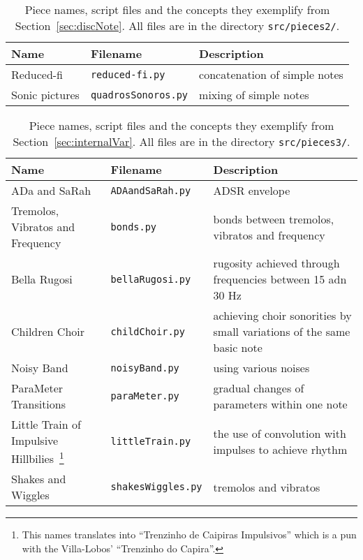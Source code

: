 \documentclass{scrreprt}
\begin{document}
\begin{table*}[htp!]
\centering
\caption{Piece names, script files and the concepts they exemplify from Section~\ref{sec:discNote}. All files are in the directory \texttt{src/pieces2/}.}
\begin{tabular}{ p{5cm} | p{3.5cm} | p{6.2cm} }
   Name & Filename & Description \\\hline
 Reduced-fi & \texttt{reduced-fi.py} & concatenation of simple notes \\
 Sonic pictures & \texttt{quadrosSonoros.py} & mixing of simple notes  \\
\end{tabular}
\end{table*}

\begin{table*}[htp!]
\centering
\caption{Piece names, script files and the concepts they exemplify from Section~\ref{sec:internalVar}. All files are in the directory \texttt{src/pieces3/}.}
\begin{tabular}{ p{5cm} | p{3.5cm} | p{6.2cm} }
   Name & Filename & Description \\\hline
 ADa and SaRah & \texttt{ADAandSaRah.py} & ADSR envelope \\
 Tremolos, Vibratos and Frequency & \texttt{bonds.py} & bonds between tremolos, vibratos and frequency  \\
 Bella Rugosi & \texttt{bellaRugosi.py} & rugosity achieved through frequencies between 15 adn 30 Hz \\
 Children Choir & \texttt{childChoir.py} & achieving choir sonorities by small variations of the same basic note \\
 Noisy Band & \texttt{noisyBand.py} & using various noises \\
 ParaMeter Transitions & \texttt{paraMeter.py} & gradual changes of parameters within one note \\
 Little Train of Impulsive Hillbilies~\footnote{This names translates into ``Trenzinho de Caipiras Impulsivos'' which is a pun with the Villa-Lobos' ``Trenzinho do Capira''.} & \texttt{littleTrain.py} & the use of convolution with impulses to achieve rhythm \\
 Shakes and Wiggles & \texttt{shakesWiggles.py} &  tremolos and vibratos \\
\end{tabular}
\end{table*}
\end{document}
